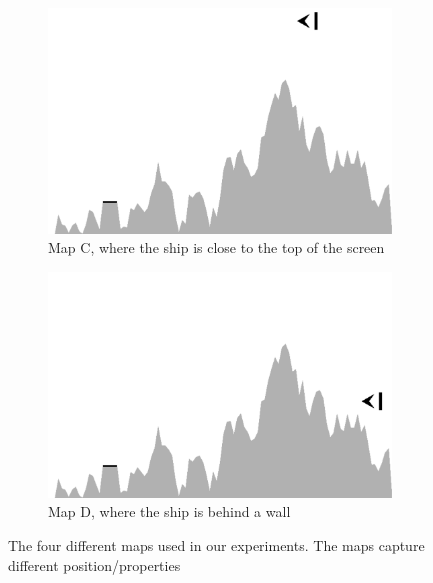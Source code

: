 \documentclass[conference]{IEEEtran}
\begin{document}
\begin{figure}[ht]
\begin{subfigure}{0.49\textwidth}
        \end{subfigure}
\\
        \begin{subfigure}{0.49\textwidth}
                \centering
                \includegraphics[width=1.0\textwidth]{./graphics/map1-tall.pdf}
                \caption{Map C, where the ship is close to the top of the screen}
                \label{fig:map1-tall}\end{subfigure}\begin{subfigure}{0.49\textwidth}
                \centering
                \includegraphics[width=1.0\textwidth]{./graphics/map1-wall.pdf}
                \caption{Map D, where the ship is behind a wall }
                \label{fig:map-wall}

        \end{subfigure}
       

         \caption{The four different maps used in our experiments. The maps capture different position/properties}
         \label{fig:maps}

\end{figure}
\end{document}
